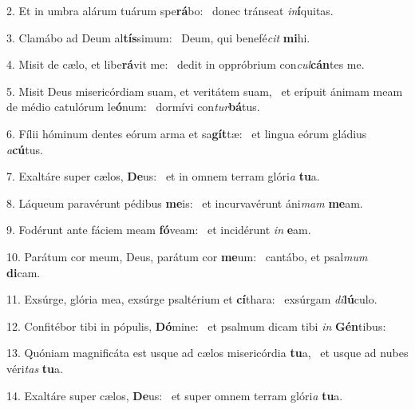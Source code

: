 2. Et in umbra alárum tuárum spe\textbf{rá}bo: \ast\  donec tránseat \textit{in}\textbf{í}quitas.\

3. Clamábo ad Deum al\textbf{tís}simum: \ast\  Deum, qui benefé\textit{cit} \textbf{mi}hi.\

4. Misit de cælo, et libe\textbf{rá}vit me: \ast\  dedit in oppróbrium con\textit{cul}\textbf{cán}tes me.\

5. Misit Deus misericórdiam suam, et veritátem suam, \dag\  et erípuit ánimam meam de médio catulórum le\textbf{ó}num: \ast\  dormívi con\textit{tur}\textbf{bá}tus.\

6. Fílii hóminum dentes eórum arma et sa\textbf{gít}tæ: \ast\  et lingua eórum gládius \textit{a}\textbf{cú}tus.\

7. Exaltáre super cælos, \textbf{De}us: \ast\  et in omnem terram glóri\textit{a} \textbf{tu}a.\

8. Láqueum paravérunt pédibus \textbf{me}is: \ast\  et incurvavérunt áni\textit{mam} \textbf{me}am.\

9. Fodérunt ante fáciem meam \textbf{fó}veam: \ast\  et incidérunt \textit{in} \textbf{e}am.\

10. Parátum cor meum, Deus, parátum cor \textbf{me}um: \ast\  cantábo, et psal\textit{mum} \textbf{di}cam.\

11. Exsúrge, glória mea, exsúrge psaltérium et \textbf{cí}thara: \ast\  exsúrgam \textit{di}\textbf{lú}culo.\

12. Confitébor tibi in pópulis, \textbf{Dó}mine: \ast\  et psalmum dicam tibi \textit{in} \textbf{Gén}tibus:\

13. Quóniam magnificáta est usque ad cælos misericórdia \textbf{tu}a, \ast\  et usque ad nubes véri\textit{tas} \textbf{tu}a.\

14. Exaltáre super cælos, \textbf{De}us: \ast\  et super omnem terram glóri\textit{a} \textbf{tu}a.\

